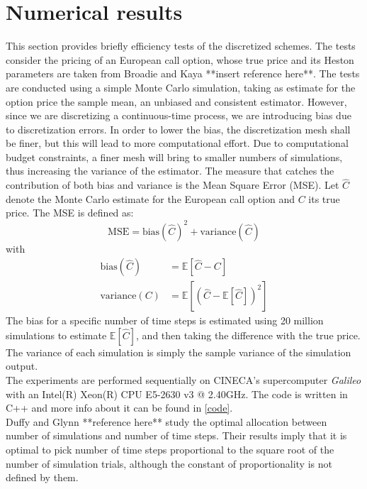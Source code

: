 \documentclass[12pt]{article}
\numberwithin{equation}{section}
\begin{document}
\section{Numerical results}
This section provides briefly efficiency tests of the discretized schemes. The tests consider the pricing of an European call option, whose true price and its Heston parameters are taken from Broadie and Kaya **insert reference here**. The tests are conducted using a simple Monte Carlo simulation, taking as estimate for the option price the sample mean, an unbiased and consistent estimator. However, since we are discretizing a continuous-time process, we are introducing bias due to discretization errors. In order to lower the bias, the discretization mesh shall be finer, but this will lead to more computational effort. Due to computational budget constraints, a finer mesh will bring to smaller numbers of simulations, thus increasing the variance of the estimator. The measure that catches the contribution of both bias and variance is the Mean Square Error (MSE). Let $\hat{C}$ denote the Monte Carlo estimate for the European call option and $C$ its true price. The MSE is defined as: \\
\begin{equation}
\text{MSE} = \text{bias}(\hat{C})^2 + \text{variance}(\hat{C})
\end{equation}
with
\begin{align}
\text{bias}(\hat{C}) &= \mathbb{E}[\hat{C}-C] \\
\text{variance}(C) &= \mathbb{E}[(\hat{C}-\mathbb{E}[\hat{C}])^2]
\end{align}
The bias for a specific number of time steps is estimated using 20 million simulations to estimate $\mathbb{E}[\hat{C}]$, and then taking the difference with the true price. The variance of each simulation is simply the sample variance of the simulation output.\\
\newline
The experiments are performed sequentially on CINECA's supercomputer \textit{Galileo} with an Intel(R) Xeon(R) CPU E5-2630 v3 @ 2.40GHz. The code is written in C++ and more info about it can be found in \ref{code}.\\
\newline
Duffy and Glynn **reference here** study the optimal allocation between number of simulations and number of time steps. Their results imply that it is optimal to pick number of time steps proportional to the square root of the number of simulation trials, although the constant of proportionality is not defined by them.
\end{document}
